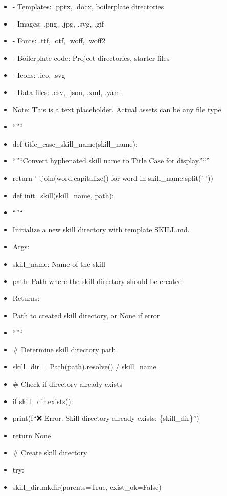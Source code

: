 \documentclass[11pt]{article}
\begin{document}
\begin{itemize}[leftmargin=*,itemsep=2pt,topsep=2pt]
\item {} - Templates: .pptx, .docx, boilerplate directories
\item {} - Images: .png, .jpg, .svg, .gif
\item {} - Fonts: .ttf, .otf, .woff, .woff2
\item {} - Boilerplate code: Project directories, starter files
\item {} - Icons: .ico, .svg
\item {} - Data files: .csv, .json, .xml, .yaml
\item {} Note: This is a text placeholder. Actual assets can be any file type.
\item {} ``''``
\item {} def title\_\allowbreak{}case\_\allowbreak{}skill\_\allowbreak{}name(skill\_\allowbreak{}name):
\item {} ``''``Convert hyphenated skill name to Title Case for display.''``''
\item {} return ' '.join(word.capitalize() for word in skill\_\allowbreak{}name.split('-'))
\item {} def init\_\allowbreak{}skill(skill\_\allowbreak{}name, path):
\item {} ``''``
\item {} Initialize a new skill directory with template SKILL.md.
\item {} Args:
\item {} skill\_\allowbreak{}name: Name of the skill
\item {} path: Path where the skill directory should be created
\item {} Returns:
\item {} Path to created skill directory, or None if error
\item {} ``''``
\item {} \# Determine skill directory path
\item {} skill\_\allowbreak{}dir = Path(path).resolve() / skill\_\allowbreak{}name
\item {} \# Check if directory already exists
\item {} if skill\_\allowbreak{}dir.exists():
\item {} print(f``❌ Error: Skill directory already exists: \{skill\_\allowbreak{}dir\}'')
\item {} return None
\item {} \# Create skill directory
\item {} try:
\item {} skill\_\allowbreak{}dir.mkdir(parents=True, exist\_\allowbreak{}ok=False)

\end{itemize}
\end{document}
